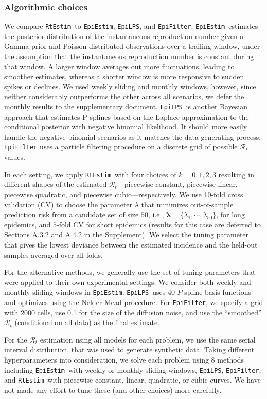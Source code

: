 \documentclass[10pt,letterpaper]{article}
\def\RtEstim{\texttt{RtEstim}}
\def\EpiEstim{\texttt{EpiEstim}}
\def\EpiLPS{\texttt{EpiLPS}}
\def\EpiFilter{\texttt{EpiFilter}}
\def\calR{\mathcal{R}}
\begin{document}
\subsubsection{Algorithmic choices}

We compare \RtEstim\ to \EpiEstim, \EpiLPS, and \EpiFilter. \EpiEstim\ estimates
the posterior distribution of the instantaneous reproduction number given a
Gamma prior and Poisson distributed observations over a trailing window, under
the assumption that the instantaneous reproduction number is constant during
that window. A larger window averages out more fluctuations, leading to smoother
estimates, whereas a shorter window is more responsive to sudden spikes or
declines. We used weekly sliding and monthly windows, however, since neither
considerably outperforms the other across all scenarios, we defer the monthly
results to the supplementary document. \EpiLPS\ is another Bayesian approach
that estimates P-splines based on the Laplace approximation to the conditional
posterior with negative binomial likelihood. It should more easily handle the
negative binomial scenarios as it matches the data generating process.
\texttt{EpiFilter} uses a particle filtering procedure on a discrete grid of
possible $\calR_t$ values.

In each setting, we apply \RtEstim\ with four choices of $k=0,1, 2, 3$ resulting
in different shapes of the estimated $\calR_t$---piecewise constant, piecewise
linear, piecewise quadratic, and piecewise cubic---respectively. We use 10-fold
cross validation (CV) to choose the parameter $\lambda$ that minimizes
out-of-sample prediction risk from a candidate set of size $50$, i.e.,
$\boldsymbol{\lambda} = \{\lambda_1, \cdots, \lambda_{50}\}$, for long
epidemics, and $5$-fold CV for short epidemics (results for this case are
deferred to Sections A.3.2 and A.4.2 in the Supplement). We select the tuning
parameter that gives the lowest deviance between the estimated
incidence and the held-out samples averaged over all folds. 

For the alternative methods, we generally use the set of tuning parameters that
were applied to their own experimental settings. We consider both weekly and
monthly sliding windows in \EpiEstim. \EpiLPS\ uses 40 $P$-spline basis
functions and optimizes using the Nelder-Mead procedure. For \EpiFilter, we
specify a grid with 2000 cells, use 0.1 for the size of the diffusion noise, and
use the ``smoothed'' $\calR_t$ (conditional on all data) as the final estimate. 

For the $\calR_t$ estimation using all models for each problem, we use the same
serial interval distribution, that was used to generate synthetic data. Taking
different hyperparameters into consideration, we solve each problem using 8
methods including \EpiEstim\ with weekly or monthly sliding windows, \EpiLPS,
\EpiFilter, and \RtEstim\ with piecewise constant, linear, quadratic, or cubic
curves. We have not made any effort to tune these (and other choices) more
carefully.
\end{document}
